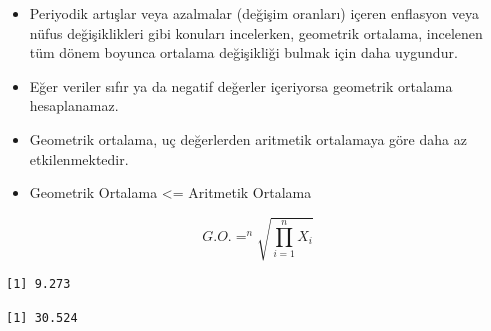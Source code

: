 \documentclass[
  letterpaper,
  DIV=11,
  numbers=noendperiod]{scrreprt}
\newenvironment{Shaded}{\begin{snugshade}}{\end{snugshade}}
\newcommand{\CommentTok}[1]{\textcolor[rgb]{0.37,0.37,0.37}{#1}}
\newcommand{\ControlFlowTok}[1]{\textcolor[rgb]{0.00,0.23,0.31}{\textbf{#1}}}
\newcommand{\DecValTok}[1]{\textcolor[rgb]{0.68,0.00,0.00}{#1}}
\newcommand{\FunctionTok}[1]{\textcolor[rgb]{0.28,0.35,0.67}{#1}}
\newcommand{\NormalTok}[1]{\textcolor[rgb]{0.00,0.23,0.31}{#1}}
\newcommand{\OtherTok}[1]{\textcolor[rgb]{0.00,0.23,0.31}{#1}}
\newcommand{\SpecialCharTok}[1]{\textcolor[rgb]{0.37,0.37,0.37}{#1}}
\begin{document}
\begin{itemize}
\item
  Periyodik artışlar veya azalmalar (değişim oranları) içeren enflasyon
  veya nüfus değişiklikleri gibi konuları incelerken, geometrik
  ortalama, incelenen tüm dönem boyunca ortalama değişikliği bulmak için
  daha uygundur.
\item
  Eğer veriler sıfır ya da negatif değerler içeriyorsa geometrik
  ortalama hesaplanamaz.
\item
  Geometrik ortalama, uç değerlerden aritmetik ortalamaya göre daha az
  etkilenmektedir.
\item
  Geometrik Ortalama \textless= Aritmetik Ortalama
\end{itemize}

\[ G.O. = ^n\sqrt{\prod_{i=1}^{n}X_i} \]

\begin{Shaded}
\end{Shaded}

\begin{verbatim}
[1] 9.273
\end{verbatim}

\begin{Shaded}
\end{Shaded}

\begin{verbatim}
[1] 30.524
\end{verbatim}

\begin{Shaded}
\end{Shaded}
\end{document}
